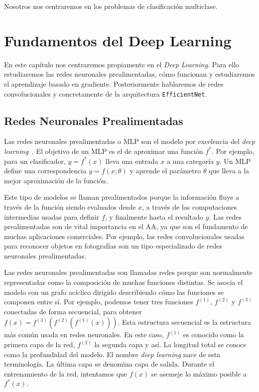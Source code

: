 Nosotros nos centraremos en los problemas de clasificación multiclase.

\chapter{Fundamentos del Deep Learning}\label{sec:deep}
En este capítulo nos centraremos propiamente en el \textit{Deep Learning}. Para ello estudiaremos las redes neuronales prealimentadas, cómo funcionan y estudiaremos el aprendizaje basado en gradiente. Posteriormente hablaremos de redes convolucionales y concretamente de la arquitectura \texttt{EfficientNet}.

\section{Redes Neuronales Prealimentadas}
Las redes neuronales prealimentadas o \ac{MLP} son el modelo por excelencia del \textit{deep learning}~\cite{Goodfellow-et-al-2016}. El objetivo de un \ac{MLP} es el de aproximar una función $f^*$. Por ejemplo, para un clasificador, $y = f^*(x)$ lleva una entrada $x$ a una categoría $y$. Un \ac{MLP} define una correspondencia $y = f(x; \theta)$ y aprende el parámetro $\theta$ que lleva a la mejor aproximación de la función.

Este tipo de modelos se llaman prealimentados porque la información fluye a través de la función siendo evaluados desde $x$, a través de las computaciones intermedias usadas para definir $f$, y finalmente hasta el resultado $y$. Las redes prealimentadas son de vital importancia en el \ac{AA}, ya que son el fundamento de muchas aplicaciones comerciales. Por ejemplo, las redes convolucionales usadas para reconocer objetos en fotografías son un tipo especializado de redes neuronales prealimentadas.

Las redes neuronales prealimentadas son llamadas redes porque son normalmente representadas como la composición de muchas funciones distintas. Se asocia el modelo con un grafo acíclico dirigido describiendo cómo las funciones se componen entre sí. Por ejemplo, podemos tener tres funciones $f^{(1)}$, $f^{(2)}$ y $f^{(3)}$ conectadas de forma secuencial, para obtener $f(x) = f^{(3)}(f^{(2)}(f^{(1)}(x)))$. Esta estructura secuencial es la estructura más común usada en redes neuronales. En este caso, $f^{(1)}$ es conocido como la primera capa de la red, $f^{(2)}$ la segunda capa y así. La longitud total se conoce como la profundidad del modelo. El nombre \textit{deep learning} nace de esta terminología. La última capa se denomina capa de salida. Durante el entrenamiento de la red, intentamos que $f(x)$ se asemeje lo máximo posible a $f^*(x)$.

